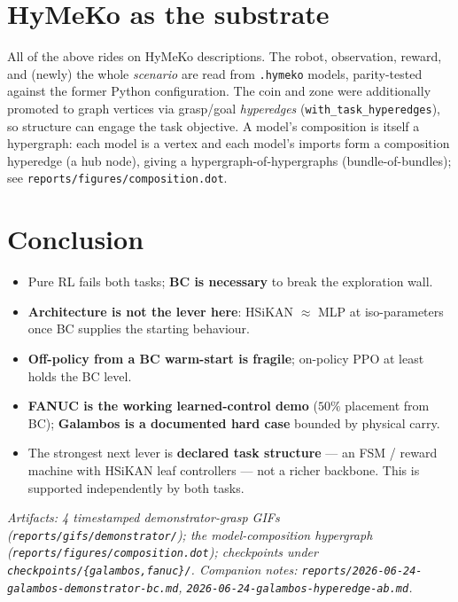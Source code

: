 \documentclass[11pt]{article}
\begin{document}
\section{HyMeKo as the substrate}
All of the above rides on HyMeKo descriptions. The robot, observation, reward, and (newly) the whole
\emph{scenario} are read from \texttt{.hymeko} models, parity-tested against the former Python configuration.
The coin and zone were additionally promoted to graph vertices via grasp/goal \emph{hyperedges}
(\texttt{with\_task\_hyperedges}), so structure can engage the task objective. A model's composition is itself a
hypergraph: each model is a vertex and each model's imports form a composition hyperedge (a hub node), giving a
hypergraph-of-hypergraphs (bundle-of-bundles); see \texttt{reports/figures/composition.dot}.

\section{Conclusion}
\begin{itemize}\itemsep2pt
\item Pure RL fails both tasks; \textbf{BC is necessary} to break the exploration wall.
\item \textbf{Architecture is not the lever here}: HSiKAN $\approx$ MLP at iso-parameters once BC supplies the
      starting behaviour.
\item \textbf{Off-policy from a BC warm-start is fragile}; on-policy PPO at least holds the BC level.
\item \textbf{FANUC is the working learned-control demo} ($50\%$ placement from BC); \textbf{Galambos is a
      documented hard case} bounded by physical carry.
\item The strongest next lever is \textbf{declared task structure} --- an FSM / reward machine with HSiKAN leaf
      controllers --- not a richer backbone. This is supported independently by both tasks.
\end{itemize}

\noindent\textit{Artifacts: 4 timestamped demonstrator-grasp GIFs (\texttt{reports/gifs/demonstrator/}); the
model-composition hypergraph (\texttt{reports/figures/composition.dot}); checkpoints under
\texttt{checkpoints/\{galambos,fanuc\}/}. Companion notes:
\texttt{reports/2026-06-24-galambos-demonstrator-bc.md}, \texttt{2026-06-24-galambos-hyperedge-ab.md}.}
\end{document}
